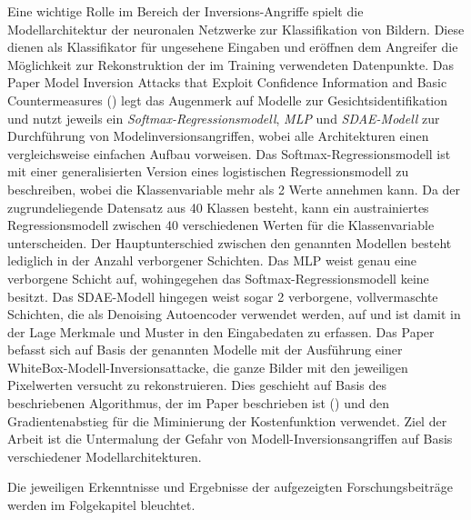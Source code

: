 Eine wichtige Rolle im Bereich der Inversions-Angriffe spielt die Modellarchitektur der neuronalen Netzwerke zur Klassifikation von Bildern. Diese dienen als Klassifikator für ungesehene Eingaben und eröffnen dem Angreifer die Möglichkeit zur Rekonstruktion der im Training verwendeten Datenpunkte. Das Paper \glqq Model Inversion Attacks that Exploit Confidence Information and Basic Countermeasures\grqq{} (\cite[7]{fredrikson_model_2015}) legt das Augenmerk auf Modelle zur Gesichtsidentifikation und nutzt jeweils ein \textit{Softmax-Regressionsmodell}, \textit{MLP} und \textit{SDAE-Modell} zur Durchführung von Modelinversionsangriffen, wobei alle Architekturen einen vergleichsweise einfachen Aufbau vorweisen. Das Softmax-Regressionsmodell ist mit einer generalisierten Version eines logistischen Regressionsmodell zu beschreiben, wobei die Klassenvariable mehr als 2 Werte annehmen kann. Da der zugrundeliegende Datensatz aus 40 Klassen besteht, kann ein austrainiertes Regressionsmodell zwischen 40 verschiedenen Werten für die Klassenvariable unterscheiden. Der Hauptunterschied zwischen den genannten Modellen  besteht lediglich in der Anzahl verborgener Schichten. Das MLP weist genau eine verborgene Schicht auf, wohingegehen das Softmax-Regressionsmodell keine besitzt. Das SDAE-Modell hingegen weist sogar 2 verborgene, vollvermaschte Schichten, die als \glqq Denoising Autoencoder\grqq{} verwendet werden, auf und ist damit in der Lage Merkmale und Muster in den Eingabedaten zu erfassen. Das Paper befasst sich auf Basis der genannten Modelle mit der Ausführung einer WhiteBox-Modell-Inversionsattacke, die ganze Bilder mit den jeweiligen Pixelwerten versucht zu rekonstruieren. Dies geschieht auf Basis des beschriebenen Algorithmus, der im Paper beschrieben ist (\cite[8]{fredrikson_model_2015}) und den Gradientenabstieg für die Miminierung der Kostenfunktion verwendet. Ziel der Arbeit ist die Untermalung der Gefahr von Modell-Inversionsangriffen auf Basis verschiedener Modellarchitekturen.

Die jeweiligen Erkenntnisse und Ergebnisse der aufgezeigten Forschungsbeiträge werden im Folgekapitel bleuchtet.

